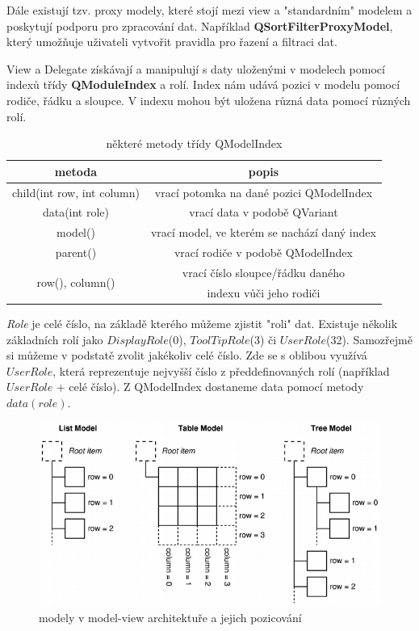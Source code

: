 Dále existují tzv. proxy modely, které stojí mezi view a "standardním" modelem a poskytují podporu pro zpracování dat.  Například \textbf{QSortFilterProxyModel}, který umožňuje uživateli vytvořit pravidla pro řazení a filtraci dat.

View a Delegate získávají a manipulují s daty uloženými v modelech pomocí indexů třídy \textbf{QModuleIndex} a rolí. Index nám udává pozici v modelu pomocí rodiče, řádku a sloupce. V indexu mohou být uložena různá data pomocí různých rolí.

\begin{table}[h]
	\centering
	\begin{tabular}{|c|c|}
		\hline	
		metoda & popis \\
		\hline
		\hline
		child(int row, int column) & vrací potomka na dané pozici QModelIndex \\
		\hline
		data(int role) & vrací data v podobě QVariant \\
		\hline
		model() & vrací model, ve kterém se nachází daný index \\
		\hline
		parent() & vrací rodiče v podobě QModelIndex \\
		\hline
	 	\multirow{2}{*}{row(), column()} & vrací číslo sloupce/řádku daného \\ 
		 & indexu vůči jeho rodiči \\
		\hline
	\end{tabular}
	\caption{některé metody třídy QModelIndex}
	\label{tab:qmodelindex}
\end{table}

\textit{Role} je celé číslo, na základě kterého můžeme zjistit "roli" dat. Existuje několik základních rolí jako $DisplayRole$(0), $ToolTipRole$(3) či $UserRole$(32). Samozřejmě si můžeme v podstatě zvolit jakékoliv celé číslo. Zde se s oblibou využívá $UserRole$, která reprezentuje nejvyšší číslo z předdefinovaných rolí (například $UserRole$ + celé číslo). Z QModelIndex dostaneme data pomocí metody $data(role)$.

\begin{figure}[h]
	\centering
	\includegraphics[scale=0.7]{pictures/qt/mv_models}
	\caption{modely v model-view architektuře a jejich pozicování}
	\label{mvModels}
\end{figure} 


